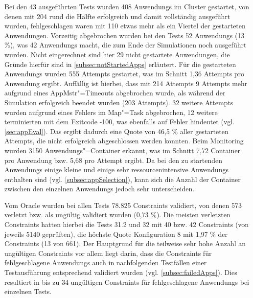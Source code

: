 Bei den 43 ausgeführten \glspl{Test} wurden 408 \glspl{Anwendung} im Cluster gestartet, von denen mit 204 rund die Hälfte erfolgreich und damit vollständig ausgeführt wurden, fehlgeschlagen waren mit 110 etwas mehr als ein Viertel der gestarteten Anwendungen.
Vorzeitig abgebrochen wurden bei den \glspl{Test} 52 \glspl{Anwendung} (13 \%), was 42 \glspl{Anwendung} macht, die zum Ende der Simulationen noch ausgeführt wurden.
Nicht eingerechnet sind hier 29 nicht gestartete Anwendungen, die Gründe hierfür sind in \cref{subsec:notStartedApps} erläutert.
Für die gestarteten \glspl{Anwendung} wurden 555 \glspl{Attempt} gestartet, was im Schnitt 1,36 \glspl{Attempt} pro \gls{Anwendung} ergibt.
Auffällig ist hierbei, dass mit 214 \glspl{Attempt} 9 \glspl{Attempt} mehr aufgrund eines \gls{AppMstr}"=Timeouts abgebrochen wurde, als während der Simulation erfolgreich beendet wurden (203 Attempts).
32 weitere \glspl{Attempt} wurden aufgrund eines Fehlers im Map"=Task abgebrochen, 12 weitere terminierten mit dem Exitcode -100, was ebenfalls auf Fehler hindeutet (vgl. \cref{sec:appEval}).
Das ergibt dadurch eine Quote von 46,5 \% aller gestarteten Attempts, die nicht erfolgreich abgeschlossen werden konnten.
Beim Monitoring wurden 3150 Anwendungs"=Container erkannt, was im Schnitt 7,72 \gls{Container} pro \gls{Anwendung} bzw. 5,68 pro \gls{Attempt} ergibt.
Da bei den zu startenden \glspl{Anwendung} einige kleine und einige sehr ressourcenintensive \glspl{Anwendung} enthalten sind (vgl. \cref{subsec:appSelection}), kann sich die Anzahl der \gls{Container} zwischen den einzelnen \glspl{Anwendung} jedoch sehr unterscheiden.

Vom Oracle wurden bei allen \glspl{Test} 78.825 Constraints validiert, von denen 573 verletzt bzw. als ungültig validiert wurden (0,73 \%).
Die meisten verletzten Constraints hatten hierbei die \glspl{Test} 31.2 und 32 mit 40 bzw. 42 Constraints (von jeweils 5140 geprüften), die höchste Quote Konfiguration 8 mit 1,97 \% der Constraints (13 von 661).
Der Hauptgrund für die teilweise sehr hohe Anzahl an ungültigen Constraints vor allem liegt darin, dass die Constraints für fehlgeschlagene \glspl{Anwendung} auch in nachfolgenden Testfällen einer Testausführung entsprechend validiert wurden (vgl. \cref{subsec:failedApps}).
Dies resultiert in bis zu 34 ungültigen Constraints für fehlgeschlagene \glspl{Anwendung} bei einzelnen Tests.
